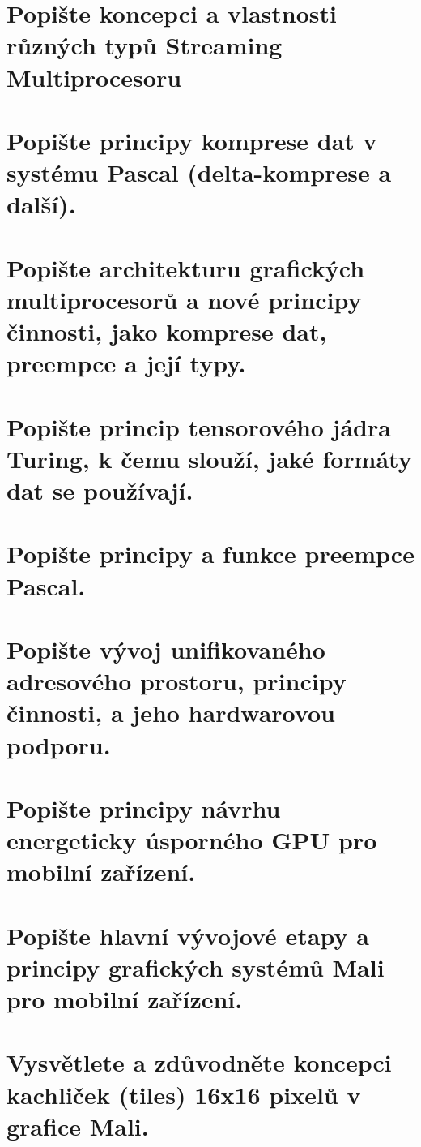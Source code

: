 \section{Popište koncepci a vlastnosti různých typů Streaming Multiprocesoru}
	\todo
	
	
\section{Popište principy komprese dat v systému Pascal (delta-komprese a další).}
	\todo
	
	
\section{Popište architekturu grafických multiprocesorů a nové principy činnosti, jako komprese dat, preempce a její typy.}
	\todo
	
	
\section{Popište princip tensorového jádra Turing, k čemu slouží, jaké formáty dat se používají.}
	\todo


\section{Popište principy a funkce preempce Pascal.}
	\todo
	
	
\section{Popište vývoj unifikovaného adresového prostoru, principy činnosti, a jeho hardwarovou podporu.}
	\todo
	
	
\section{Popište principy návrhu energeticky úsporného GPU pro mobilní zařízení.}
	\todo
	
	
\section{Popište hlavní vývojové etapy a principy grafických systémů Mali pro mobilní zařízení.}
	\todo
	
	
\section{Vysvětlete a zdůvodněte koncepci kachliček (tiles) 16x16 pixelů v grafice Mali.}
	\todo
	
